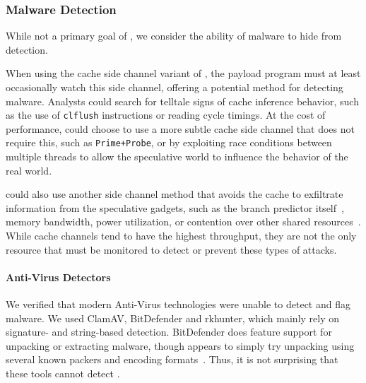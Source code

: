 \subsubsection{Malware Detection}
\label{subsubsec:malware}
While not a primary goal of \speculake, we consider the ability of \speculake
malware to hide from detection.

When using the cache side channel variant of \speculake, the payload program
must at least occasionally watch this side channel, offering a potential method
for detecting \speculake malware. Analysts could search for telltale signs of
cache inference behavior, such as the use of \texttt{clflush} instructions or
reading cycle timings. At the cost of performance, \speculake could choose to
use a more subtle cache side channel that does not require this, such as
\texttt{Prime+Probe}, or by exploiting race conditions between multiple threads
to allow the speculative world to influence the behavior of the real world.

\speculake could also use another side channel method that avoids the cache to
exfiltrate information from the speculative gadgets, such as the branch
predictor itself~\cite{evtyushkin2018branchscope}, memory bandwidth, power
utilization, or contention over other shared
resources~\cite{kiriansky2018speculative}. While cache channels tend to have the
highest throughput, they are not the only resource that must be monitored to
detect or prevent these types of attacks. 

\paragraph{Anti-Virus Detectors}
We verified that modern Anti-Virus technologies were unable to detect
and flag \speculake malware. We used ClamAV, BitDefender and rkhunter, which
mainly rely on signature- and string-based detection. BitDefender does feature
support for unpacking or extracting malware, though appears to simply try
unpacking using several known packers and encoding formats~\cite{BitDefender}.
Thus, it is not surprising that these tools cannot detect
\speculake.

